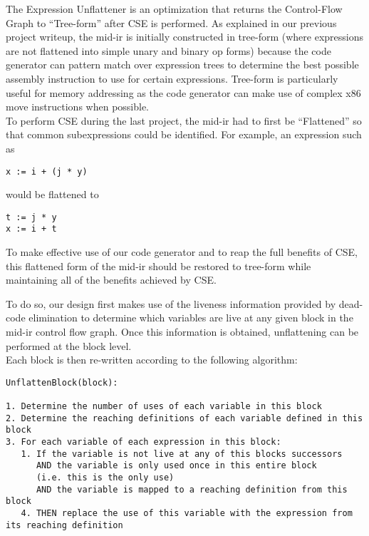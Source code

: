 \documentclass[11pt]{article}
\begin{document}
The Expression Unflattener is an optimization that returns the
Control-Flow Graph to ``Tree-form'' after CSE is performed. As
explained in our previous project writeup, the mid-ir is initially constructed
in tree-form (where expressions are not flattened into simple unary
and binary op forms) because the code generator can pattern match over
expression trees to determine the best possible assembly
instruction to use for certain expressions. Tree-form is particularly
useful for memory addressing as the code generator can make use of
complex x86 move instructions when possible.\\

To perform CSE during the last project, the mid-ir had to first be
``Flattened'' so that common subexpressions could be identified. For
example, an expression such as 

\begin{verbatim}
x := i + (j * y)
\end{verbatim} 

\noindent would be flattened to 

\begin{verbatim}
t := j * y 
x := i + t
\end{verbatim}

To make effective use of our code generator and to reap the full
benefits of CSE, this flattened form of the mid-ir should be restored
to tree-form while maintaining all of the benefits achieved by CSE. 

To do so, our design first makes use of the liveness information
provided by dead-code elimination to determine which variables are
live at any given block in the mid-ir control flow graph. Once this
information is obtained, unflattening can be performed at the block
level.\\


\noindent Each block is then re-written according to the following algorithm: 

\begin{verbatim}
UnflattenBlock(block):

1. Determine the number of uses of each variable in this block 
2. Determine the reaching definitions of each variable defined in this
block
3. For each variable of each expression in this block: 
   1. If the variable is not live at any of this blocks successors 
      AND the variable is only used once in this entire block 
      (i.e. this is the only use)
      AND the variable is mapped to a reaching definition from this block 
   4. THEN replace the use of this variable with the expression from
its reaching definition
\end{verbatim}
\end{document}
